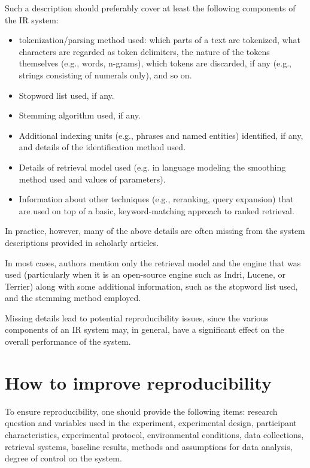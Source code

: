 Such a description should preferably cover at least the following components of the IR system:

\begin{itemize}
 \item tokenization/parsing method used: which parts of a text are tokenized, what characters are regarded as token delimiters, the nature of the tokens themselves (e.g., words, n-grams), which tokens are discarded, if any (e.g., strings consisting of numerals only), and so on.
 \item Stopword list used, if any.
 \item Stemming algorithm used, if any.
 \item Additional indexing units (e.g., phrases and named entities) identified, if any, and details of the identification method used.
 \item Details of retrieval model used (e.g. in language modeling the smoothing method used and values of parameters).
 \item Information about other techniques (e.g., reranking, query expansion) that are used on top of a basic, keyword-matching approach to ranked retrieval.
\end{itemize}

In practice, however, many of the above details are often missing from the system descriptions provided in scholarly articles.

In most cases, authors mention only the retrieval model and the engine that was used (particularly when it is an open-source engine such as Indri, Lucene, or Terrier) along with some additional information, such as the stopword list used, and the stemming method employed.

Missing details lead to potential reproducibility issues, since the various components of an IR system may, in general, have a significant effect on the overall performance of the system.

\section{How to improve reproducibility}

To ensure reproducibility, one should provide the following items: research question and variables used in the experiment, experimental design, participant characteristics, experimental protocol, environmental conditions, data collections, retrieval systems, baseline results, methods and assumptions for data analysis, degree of control on the system.

